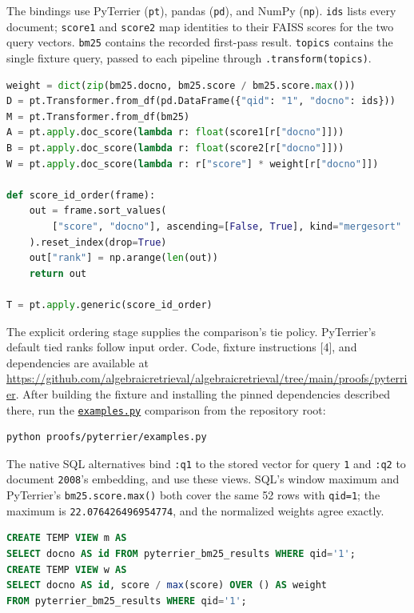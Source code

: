 \documentclass{article}
\begin{document}
The bindings use PyTerrier (\texttt{pt}), pandas (\texttt{pd}), and NumPy (\texttt{np}). \texttt{ids} lists every document; \texttt{score1} and \texttt{score2} map identities to their FAISS scores for the two query vectors. \texttt{bm25} contains the recorded first-pass result. \texttt{topics} contains the single fixture query, passed to each pipeline through \texttt{.transform(topics)}.

\begin{lstlisting}[language=Python]
weight = dict(zip(bm25.docno, bm25.score / bm25.score.max()))
D = pt.Transformer.from_df(pd.DataFrame({"qid": "1", "docno": ids}))
M = pt.Transformer.from_df(bm25)
A = pt.apply.doc_score(lambda r: float(score1[r["docno"]]))
B = pt.apply.doc_score(lambda r: float(score2[r["docno"]]))
W = pt.apply.doc_score(lambda r: r["score"] * weight[r["docno"]])

def score_id_order(frame):
    out = frame.sort_values(
        ["score", "docno"], ascending=[False, True], kind="mergesort"
    ).reset_index(drop=True)
    out["rank"] = np.arange(len(out))
    return out

T = pt.apply.generic(score_id_order)
\end{lstlisting}

The explicit ordering stage supplies the comparison's tie policy. PyTerrier's default tied ranks follow input order. Code, fixture instructions {[}4{]}, and dependencies are available at \url{https://github.com/algebraicretrieval/algebraicretrieval/tree/main/proofs/pyterrier}. After building the fixture and installing the pinned dependencies described there, run the \href{https://github.com/algebraicretrieval/algebraicretrieval/blob/main/proofs/pyterrier/examples.py}{\texttt{examples.py}} comparison from the repository root:

\begin{lstlisting}[language=bash]
python proofs/pyterrier/examples.py
\end{lstlisting}

The native SQL alternatives bind \texttt{:q1} to the stored vector for query \texttt{1} and \texttt{:q2} to document \texttt{2008}'s embedding, and use these views. SQL's window maximum and PyTerrier's \texttt{bm25.score.max()} both cover the same 52 rows with \texttt{qid=\textquotesingle{}1\textquotesingle{}}; the maximum is \texttt{22.076426496954774}, and the normalized weights agree exactly.

\begin{lstlisting}[language=SQL]
CREATE TEMP VIEW m AS
SELECT docno AS id FROM pyterrier_bm25_results WHERE qid='1';
CREATE TEMP VIEW w AS
SELECT docno AS id, score / max(score) OVER () AS weight
FROM pyterrier_bm25_results WHERE qid='1';
\end{lstlisting}
\end{document}
